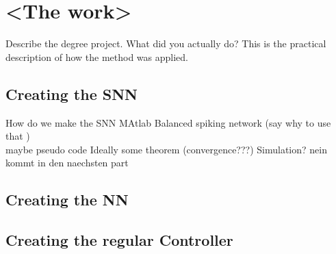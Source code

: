 \chapter{<The work>}

Describe the degree project. What did you actually do? This is the practical description of how the method was applied.
\section{Creating the SNN}
How do we make the SNN
MAtlab
Balanced spiking network (say why to use that )\\
maybe pseudo code
Ideally some theorem (convergence???)
Simulation? nein kommt in den naechsten part
\section{Creating the NN}

\section{Creating the regular Controller}